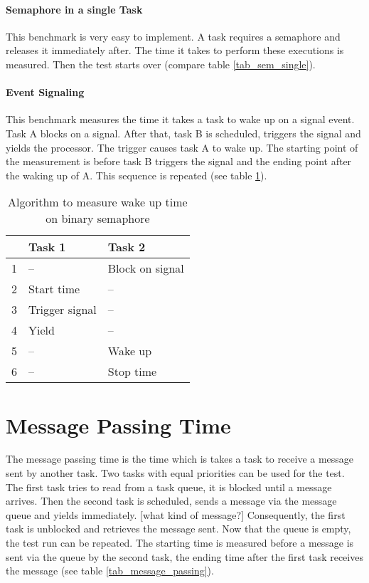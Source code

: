 \paragraph{Semaphore in a single Task}
This benchmark is very easy to implement.
A task requires a semaphore and releases it immediately after.
The time it takes to perform these executions is measured.
Then the test starts over (compare table \ref{tab_sem_single}).

\paragraph{Event Signaling}
This benchmark measures the time it takes a task to wake up on a signal event.
Task A blocks on a signal.
After that, task B is scheduled, triggers the signal and yields the processor. 
The trigger causes task A to wake up.
The starting point of the measurement is before task B triggers the signal and the ending point after the waking up of A.
This sequence is repeated (see table \ref{tab_binary_semaphore}).

\begin{table}[htbp]
	\centering
		\begin{tabular}{|l|l|l|}
			\hline
				& Task 1 							 	 & Task 2 										\\
				\hline 
				1 & --									   & Block on signal						\\
			  2 & Start time		 				 & --													\\
			  3 & Trigger signal				 & --													\\
			  4 & Yield								 	 & --													\\
			  5 & --									   & Wake up										\\
			  6 & --									 	 & Stop time									\\	  
			\hline
		\end{tabular}
	\caption{Algorithm to measure wake up time on binary semaphore}
	\label{tab_binary_semaphore}
\end{table}

\section{Message Passing Time}
The message passing time is the time which is takes a task to receive a message sent by another task.
Two tasks with equal priorities can be used for the test.
The first task tries to read from a task queue, it is blocked until a message arrives.
Then the second task is scheduled, sends a message via the message queue and yields immediately. [what kind of message?] 
Consequently, the first task is unblocked and retrieves the message sent.
Now that the queue is empty, the test run can be repeated.
The starting time is measured before a message is sent via the queue by the second task, the ending time after the first task receives the message (see table \ref{tab_message_passing}).

